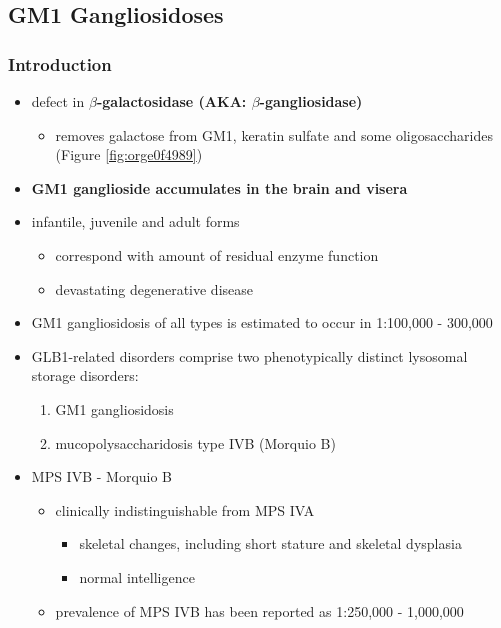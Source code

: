 \documentclass[12pt]{scrartcl}
\begin{document}
\subsection{GM1 Gangliosidoses}
\label{sec:org8a70705}
\subsubsection{Introduction}
\label{sec:orgcc50fa4}
\begin{itemize}
\item defect in \textbf{\(\beta\)-galactosidase (AKA: \(\beta\)-gangliosidase)}
\begin{itemize}
\item removes galactose from GM1, keratin sulfate and some oligosaccharides (Figure \ref{fig:orge0f4989})
\end{itemize}
\item \textbf{GM1 ganglioside accumulates in the brain and visera}
\item infantile, juvenile and adult forms
\begin{itemize}
\item correspond with amount of residual enzyme function
\item devastating degenerative disease
\end{itemize}
\item GM1 gangliosidosis of all types is estimated to occur in 1:100,000 - 300,000
\item GLB1-related disorders comprise two phenotypically distinct lysosomal storage disorders:
\begin{enumerate}
\item GM1 gangliosidosis
\item mucopolysaccharidosis type IVB (Morquio B)
\end{enumerate}
\item MPS IVB - Morquio B
\begin{itemize}
\item clinically indistinguishable from MPS IVA 
\begin{itemize}
\item skeletal changes, including short stature and skeletal dysplasia
\item normal intelligence
\end{itemize}
\item prevalence of MPS IVB has been reported as 1:250,000 - 1,000,000
\end{itemize}
\end{itemize}
\end{document}
